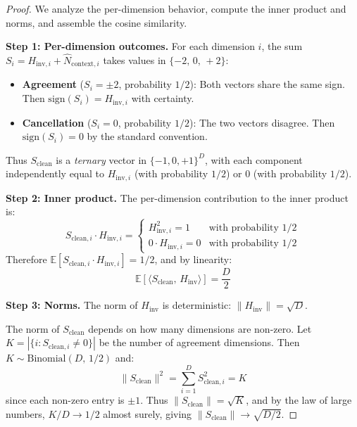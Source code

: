 \documentclass[a4paper,11pt]{article}
\begin{document}
\begin{proof}
We analyze the per-dimension behavior, compute the inner product and norms, and assemble the cosine similarity.

\textbf{Step 1: Per-dimension outcomes.}
For each dimension $i$, the sum $S_i = H_{\text{inv},i} + \hat{N}_{\text{context},i}$ takes values in $\{-2,\, 0,\, +2\}$:
\begin{itemize}
    \item \textbf{Agreement} ($S_i = \pm 2$, probability $1/2$): Both vectors share the same sign. Then $\text{sign}(S_i) = H_{\text{inv},i}$ with certainty.
    \item \textbf{Cancellation} ($S_i = 0$, probability $1/2$): The two vectors disagree. Then $\text{sign}(S_i) = 0$ by the standard convention.
\end{itemize}
Thus $S_{\text{clean}}$ is a \textit{ternary} vector in $\{-1, 0, +1\}^D$, with each component independently equal to $H_{\text{inv},i}$ (with probability $1/2$) or $0$ (with probability $1/2$).

\textbf{Step 2: Inner product.}
The per-dimension contribution to the inner product is:
\begin{equation}
    S_{\text{clean},i} \cdot H_{\text{inv},i} = \begin{cases} H_{\text{inv},i}^2 = 1 & \text{with probability } 1/2 \\ 0 \cdot H_{\text{inv},i} = 0 & \text{with probability } 1/2 \end{cases}
\end{equation}
Therefore $\mathbb{E}[S_{\text{clean},i} \cdot H_{\text{inv},i}] = 1/2$, and by linearity:
\begin{equation}
    \mathbb{E}\!\left[\langle S_{\text{clean}},\, H_{\text{inv}} \rangle\right] = \frac{D}{2}
    \label{eq:inner_product}
\end{equation}

\textbf{Step 3: Norms.}
The norm of $H_{\text{inv}}$ is deterministic: $\|H_{\text{inv}}\| = \sqrt{D}$.

The norm of $S_{\text{clean}}$ depends on how many dimensions are non-zero. Let $K = |\{i : S_{\text{clean},i} \neq 0\}|$ be the number of agreement dimensions. Then $K \sim \text{Binomial}(D,\, 1/2)$ and:
\begin{equation}
    \|S_{\text{clean}}\|^2 = \sum_{i=1}^{D} S_{\text{clean},i}^2 = K
    \label{eq:norm_sclean}
\end{equation}
since each non-zero entry is $\pm 1$. Thus $\|S_{\text{clean}}\| = \sqrt{K}$, and by the law of large numbers, $K/D \to 1/2$ almost surely, giving $\|S_{\text{clean}}\| \to \sqrt{D/2}$.


\end{proof}
\end{document}
